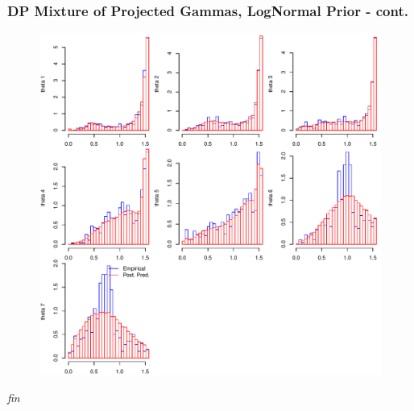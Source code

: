 \documentclass[aspectratio=169]{beamer}
\begin{document}
\begin{frame}
  \frametitle{DP Mixture of Projected Gammas, LogNormal Prior - cont.}
  \begin{figure}
    \centering
    \includegraphics[scale = 0.43]{./images/dppgln_emp_v_pred_2_1e1}
  \end{figure}
\end{frame}

\begin{frame}
	\begin{center}
		{\huge \emph{fin}}
	\end{center}
\end{frame}
\end{document}
